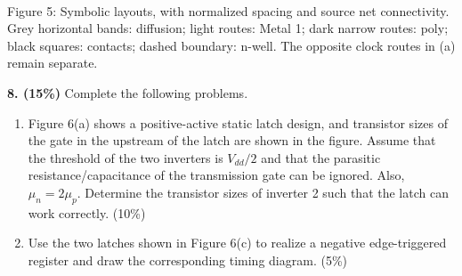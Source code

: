 \documentclass[10pt]{article}
\begin{document}
\begin{center}
\\Figure 5: Symbolic layouts, with normalized spacing and source net connectivity. Grey horizontal bands: diffusion; light routes: Metal 1; dark narrow routes: poly; black squares: contacts; dashed boundary: n-well. The opposite clock routes in (a) remain separate.\end{center}\newpage\textbf{8. (15\%)} Complete the following problems.
\begin{enumerate}[label=(\alph*)]
\item Figure 6(a) shows a positive-active static latch design, and transistor sizes of the gate in the upstream of the latch are shown in the figure. Assume that the threshold of the two inverters is $V_{dd}/2$ and that the parasitic resistance/capacitance of the transmission gate can be ignored. Also, $\mu_n=2\mu_p$. Determine the transistor sizes of inverter 2 such that the latch can work correctly. (10\%)
\item Use the two latches shown in Figure 6(c) to realize a negative edge-triggered register and draw the corresponding timing diagram. (5\%)
\end{enumerate}
\end{document}
